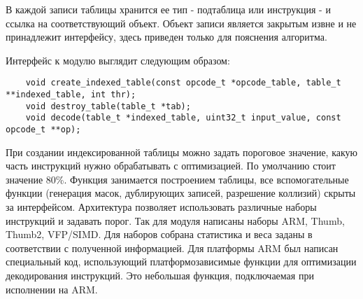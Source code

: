 В каждой записи таблицы хранится ее тип - подтаблица или инструкция - и ссылка на соответствующий объект. Объект записи является закрытым извне и не принадлежит интерфейсу, здесь приведен только для пояснения алгоритма.

Интерфейс к модулю выглядит следующим образом:

\scriptsize
\begin{verbatim}
    void create_indexed_table(const opcode_t *opcode_table, table_t **indexed_table, int thr);
    void destroy_table(table_t *tab);
    void decode(table_t *indexed_table, uint32_t input_value, const opcode_t **op);
\end{verbatim}
\normalsize


При создании индексированной таблицы можно задать пороговое значение, какую часть инструкций нужно обрабатывать с оптимизацией. По умолчанию стоит значение 80\%. Функция занимается построением таблицы, все вспомогательные функции (генерация масок, дублирующих записей, разрешение коллизий) скрыты за интерфейсом. Архитектура позволяет использовать различные наборы инструкций и задавать порог. Так для модуля написаны наборы ARM, Thumb, Thumb2, VFP/SIMD. Для наборов собрана статистика и веса заданы в соответствии с полученной информацией. Для платформы ARM был написан специальный код, использующий платформозависимые функции для оптимизации декодирования инструкций. Это небольшая функция, подключаемая при исполнении на ARM.

